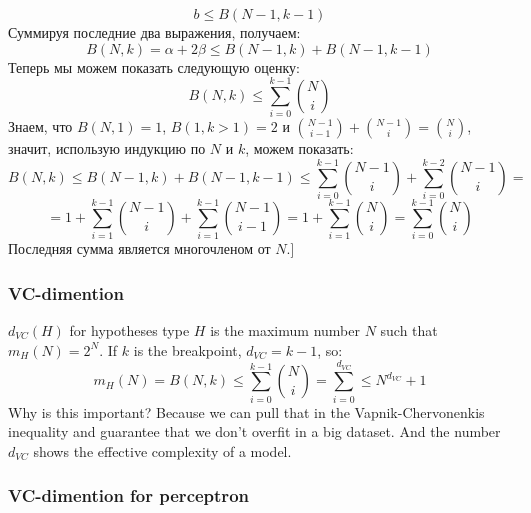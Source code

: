 $$b\le B(N-1,k-1)$$
Суммируя последние два выражения, получаем:
$$B(N,k)=\alpha+2\beta\le B(N-1, k)+B(N-1,k-1)$$
Теперь мы можем показать следующую оценку:
$$B(N,k)\le\sum\limits_{i=0}^{k-1}\binom{N}{i}$$
Знаем, что $B(N,1)=1$, $B(1,k>1)=2$ и $\binom{N-1}{i-1}+\binom{N-1}{i}=\binom{N}{i}$, значит, использую индукцию по $N$ и $k$, можем показать:
$$B(N,k)\le B(N-1,k)+B(N-1,k-1)\le\sum\limits_{i=0}^{k-1}\binom{N-1}{i}+\sum\limits_{i=0}^{k-2}\binom{N-1}{i}=$$ $$=1+\sum\limits_{i=1}^{k-1}\binom{N-1}{i}+\sum\limits_{i=1}^{k-1}\binom{N-1}{i-1}=1+\sum\limits_{i=1}^{k-1}\binom{N}{i}=\sum\limits_{i=0}^{k-1}\binom{N}{i}$$
Последняя сумма является многочленом от $N$.]

\subsubsection*{VC-dimention}

$d_{VC}(H)$ for hypotheses type $H$ is the maximum number $N$ such that $m_H(N)=2^N$. If $k$ is the breakpoint, $d_{VC}=k-1$, so:
$$m_H(N)=B(N,k)\le\sum\limits_{i=0}^{k-1}\binom{N}{i}=\sum\limits_{i=0}^{d_{VC}}\le N^{d_{VC}}+1$$
Why is this important? Because we can pull that in the Vapnik-Chervonenkis inequality and guarantee that we don't overfit in a big dataset. And the number $d_{VC}$ shows the effective complexity of a model.

\subsubsection*{VC-dimention for perceptron}

